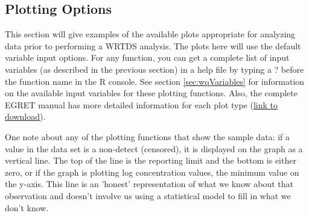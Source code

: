 \documentclass[a4paper,11pt]{article}\usepackage[]{graphicx}\usepackage[]{color}
\begin{document}
\subsection{Plotting Options}
\label{sec:plotOptionsWQ}
\FloatBarrier

This section will give examples of the available plots appropriate for analyzing data prior to performing a WRTDS analysis. The plots here will use the default variable input options.  For any function, you can get a complete list of input variables (as described in the previous section) in a help file by typing a ? before the function name in the R console. See section \ref{sec:wqVariables} for information on the available input variables for these plotting functions. Also, the complete EGRET manual has more detailed information for each plot type (\href{https://github.com/USGS-R/EGRET/raw/Documentation/EGRET%2Bmanual_4.doc}{link to download}).

One note about any of the plotting functions that show the sample data: if a value in the data set is a non-detect (censored), it is displayed on the graph as a vertical line.  The top of the line is the reporting limit and the bottom is either zero, or if the graph is plotting log concentration values, the minimum value on the y-axis.  This line is an 'honest' representation of what we know about that observation and doesn't involve us using a statistical model to fill in what we don't know. 
\end{document}
